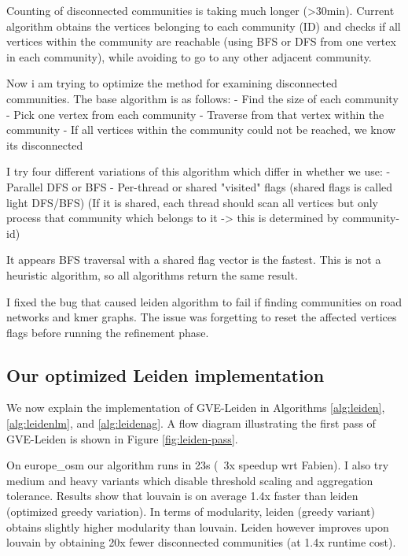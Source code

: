 

Counting of disconnected communities is taking much longer (>30min). Current algorithm obtains the vertices belonging to each community (ID) and checks if all vertices within the community are reachable (using BFS or DFS from one vertex in each community), while avoiding to go to any other adjacent community.

Now i am trying to optimize the method for examining disconnected communities.
The base algorithm is as follows:
- Find the size of each community
- Pick one vertex from each community
- Traverse from that vertex within the community
- If all vertices within the community could not be reached, we know its disconnected

I try four different variations of this algorithm which differ in whether we use:
- Parallel DFS or BFS
- Per-thread or shared "visited" flags (shared flags is called light DFS/BFS)
(If it is shared, each thread should scan all vertices but only process that community which belongs to it -> this is determined by community-id)

It appears BFS traversal with a shared flag vector is the fastest. This is not a heuristic algorithm, so all algorithms return the same result.


I fixed the bug that caused leiden algorithm to fail if finding communities on road networks and kmer graphs. The issue was forgetting to reset the affected vertices flags before running the refinement phase.




\subsection{Our optimized Leiden implementation}

We now explain the implementation of GVE-Leiden in Algorithms \ref{alg:leiden}, \ref{alg:leidenlm}, and \ref{alg:leidenag}. A flow diagram illustrating the first pass of GVE-Leiden is shown in Figure \ref{fig:leiden-pass}.


On europe\_osm our algorithm runs in 23s (~3x speedup wrt Fabien). I also try medium and heavy variants which disable threshold scaling and aggregation tolerance. Results show that louvain is on average 1.4x faster than leiden (optimized greedy variation). In terms of modularity, leiden (greedy variant) obtains slightly higher modularity than louvain. Leiden however improves upon louvain by obtaining 20x fewer disconnected communities (at 1.4x runtime cost).


